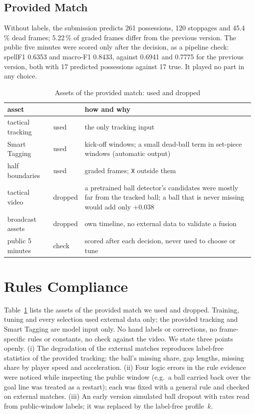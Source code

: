\documentclass[conference]{IEEEtran}
\newcommand{\spf}{spellF1}
\begin{document}
\subsection{Provided Match}

Without labels, the submission predicts 261 possessions, 120 stoppages and 45.4\,\% dead frames; 5.22\,\% of graded
frames differ from the previous version. The public five minutes were scored only after the decision, as a pipeline
check: \spf{} 0.6353 and macro-F1 0.8433, against 0.6941 and 0.7775 for the previous version, both with 17 predicted
possessions against 17 true. It played no part in any choice.

\begin{table}[t]
\caption{Assets of the provided match: used and dropped}
\label{tab:assets}
\centering
\footnotesize
\begin{tabularx}{\columnwidth}{@{}>{\raggedright\arraybackslash}p{20mm} l >{\raggedright\arraybackslash}X@{}}
\toprule
asset & & how and why\\
\midrule
tactical tracking & used & the only tracking input\\
Smart Tagging & used & kick-off windows; a small dead-ball term in set-piece windows (automatic output)\\
half boundaries & used & graded frames; \texttt{X} outside them\\
tactical video & dropped & a pretrained ball detector's candidates were mostly far from the tracked ball; a ball that is never missing would add only $+0.038$\\
broadcast assets & dropped & own timeline, no external data to validate a fusion\\
public 5 minutes & check & scored after each decision, never used to choose or tune\\
\bottomrule
\end{tabularx}
\end{table}

\section{Rules Compliance}
\label{sec:compliance}

Table~\ref{tab:assets} lists the assets of the provided match we used and dropped. Training, tuning and every
selection used external data only; the provided tracking and Smart Tagging are model input
only. No hand labels or corrections, no frame-specific rules or constants, no check against the video. We state three
points openly. (i) The degradation of the external matches reproduces label-free statistics of the provided tracking:
the ball's missing share, gap lengths, missing share by player speed and acceleration. (ii) Four logic errors in the
rule evidence were noticed while inspecting the public window (e.g.\ a ball carried back over the goal line was
treated as a restart); each was fixed with a general rule and checked on external matches. (iii) An early version
simulated ball dropout with rates read from public-window labels; it was replaced by the label-free profile~$k$.
\end{document}
